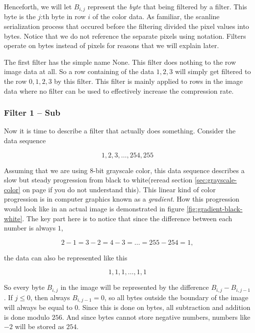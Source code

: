 Henceforth, we will let $B_{i,j}$ represent the \textit{byte} that
being filtered by a filter. This byte is the $j$:th byte in row $i$ of
the color data. As familiar, the scanline serialization process that
occured before the filtering divided the pixel values into
bytes. Notice that we do not reference the separate pixels using
notation. Filters operate on bytes instead of pixels for reasons that
we will explain later.

The first filter has the simple name None. This filter does nothing to
the row image data at all. So a row containing of the data $1,2,3$
will simply get filtered to the row $0,1,2,3$ by this filter. This
filter is mainly applied to rows in the image data where no filter can
be used to effectively increase the compression rate.

\subsubsection{Filter 1 -- Sub}

Now it is time to describe a filter that actually does
something. Consider the data sequence

\begin{equation}
  \label{eq:1-seq}
  1,2,3,\dots,254,255
\end{equation}

Assuming that we are using 8-bit grayscale color, this data sequence
describes a slow but steady progression from black to white(reread
section \ref{sec:grayscale-color} on page
\pageref{sec:grayscale-color} if you do not understand this). This
linear kind of color progression is in computer graphics known as a
\textit{gradient}\cite{sayood2003lossless}. How this progression would
look like in an actual image is demonstrated in figure
\ref{fig:gradient-black-white}. The key part here is to notice that
since the difference between each number is always $1$,

\begin{equation*}
  2-1=3-2=4-3=\dots=255-254=1,
\end{equation*}

the data can also be represented
like this

\begin{equation}
  \label{eq:filter1-seq}
  1,1,1,\dots,1,1
\end{equation}

So every byte $B_{i,j}$ in the image will be represented by the
difference $B_{i,j} - B_{i,j-1}$. If $j \le 0$, then always $B_{i,j-1}
= 0$, so all bytes outside the boundary of the image will always be
equal to $0$. Since this is done on bytes, all subtraction and
addition is done modulo $256$. And since bytes cannot store negative
numbers, numbers like $-2$ will be stored as $254$.

